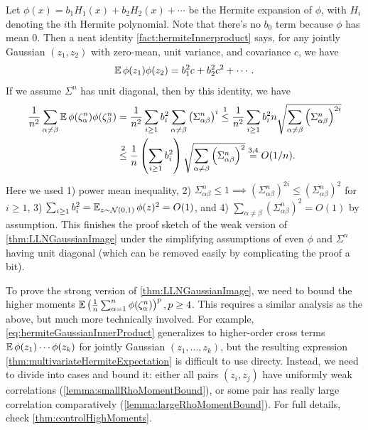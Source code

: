 \documentclass[main.tex]{subfiles}
\begin{document}
Let $\phi(x)=b_{1}H_{1}(x)+b_{2}H_{2}(x)+\cdots$ be the Hermite expansion of $\phi$, with $H_{i}$ denoting the $i$th Hermite polynomial. Note that there's no $b_{0}$ term because $\phi$ has mean 0. Then a neat identity \cref{fact:hermiteInnerproduct} says, for any jointly Gaussian $(z_{1},z_{2})$ with zero-mean, unit variance, and covariance $c$, we have
\begin{equation}
\EV\phi(z_{1})\phi(z_{2})=b_{1}^{2}c+b_{2}^{2}c^{2}+\cdots.\label{eq:hermiteGaussianInnerProduct}
\end{equation}
If we assume $\Sigma^{n}$ has unit diagonal, then by this identity, we have
\begin{align*}
\frac{1}{n^{2}}\sum_{\alpha\ne\beta}\operatorname*{\mathbb{E}}\phi(\zeta_{\alpha}^{n})\phi(\zeta_{\beta}^{n})
&=\frac{1}{n^{2}}\sum_{i\ge1}b_{i}^{2}\sum_{\alpha\ne\beta}\left(\Sigma_{\alpha\beta}^{n}\right)^{i}
\overset{1}{\le}\frac{1}{n^{2}}\sum_{i\ge1}b_{i}^{2}n\sqrt{\sum_{\alpha\ne\beta}\left(\Sigma_{\alpha\beta}^{n}\right)^{2i}}\\
&\overset{2}{\le}\frac{1}{n}\left(\sum_{i\ge1}b_{i}^{2}\right)\sqrt{\sum_{\alpha\ne\beta}\left(\Sigma_{\alpha\beta}^{n}\right)^{2}}
\overset{3,4}{=} O(1/n).
\end{align*}
Here we used 1) power mean inequality, 2) $\Sigma_{\alpha\beta}^{n}\le1\implies(\Sigma_{\alpha\beta}^{n})^{2i}\le(\Sigma_{\alpha\beta}^{n})^{2}$ for $i\ge1$, 3) $\sum_{i\ge1}b_{i}^{2}=\operatorname*{\mathbb{E}}_{z\sim\mathcal{N}(0,1)}\phi(z)^2=O(1)$, and 4) $\sum_{\alpha\ne\beta}\left(\Sigma_{\alpha\beta}^{n}\right)^{2}=O(1)$ by assumption. This finishes the proof sketch of the weak version of \cref{thm:LLNGaussianImage} under the simplifying assumptions of even $\phi$ and $\Sigma^{n}$ having unit diagonal (which can be removed easily by complicating the proof a bit).

To prove the strong version of \cref{thm:LLNGaussianImage}, we need to bound the higher moments $\operatorname*{\mathbb{E}}\left(\frac{1}{n}\sum_{\alpha=1}^{n}\phi(\zeta_{\alpha}^{n})\right)^{p},p\ge4$. This requires a similar analysis as the above, but much more technically involved. For example, \cref{eq:hermiteGaussianInnerProduct} generalizes to higher-order cross terms $\operatorname*{\mathbb{E}}\phi(z_{1})\cdots\phi(z_{k})$ for jointly Gaussian $(z_{1},\ldots,z_{k})$, but the resulting expression \cref{thm:multivariateHermiteExpectation} is difficult to use directy. Instead, we need to divide into cases and bound it: either all pairs $(z_{i},z_{j})$ have uniformly weak correlations (\cref{lemma:smallRhoMomentBound}), or some pair has really large correlation comparatively (\cref{lemma:largeRhoMomentBound}). For full details, check \cref{thm:controlHighMoments}.
\end{document}
